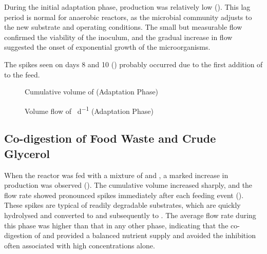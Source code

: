 \documentclass[12pt, a4paper, oneside]{report}
\begin{document}
During the initial adaptation phase,  production was relatively low (). This lag period is normal for anaerobic reactors, as the microbial community adjusts to the new substrate and operating conditions. The small but measurable  flow confirmed the viability of the inoculum, and the gradual increase in flow suggested the onset of exponential growth of the microorganisms.

The spikes seen on days \num{8} and \num{10} () probably occurred due to the first addition of  to the feed.

\begin{figure}[H]
    \centering
    \caption{Cumulative volume of  \unit{\nml} (Adaptation Phase)}
    \label{graph:pre-accumulation}
\end{figure}

\begin{figure}[H]
    \centering
    \caption{Volume flow of  \unit{\nml\per\day} (Adaptation Phase)}
    \label{graph:pre-flow}
\end{figure}

\subsection{Co-digestion of Food Waste and Crude Glycerol}
\label{subsec:codigestion_phase}

When the reactor was fed with a mixture of  and , a marked increase in  production was observed (). The cumulative  volume increased sharply, and the flow rate showed pronounced spikes immediately after each feeding event (). These spikes are typical of readily degradable substrates, which are quickly hydrolysed and converted to  and subsequently to . The average flow rate during this phase was higher than that in any other phase, indicating that the co-digestion of  and  provided a balanced nutrient supply and avoided the inhibition often associated with high  concentrations alone.
\end{document}
